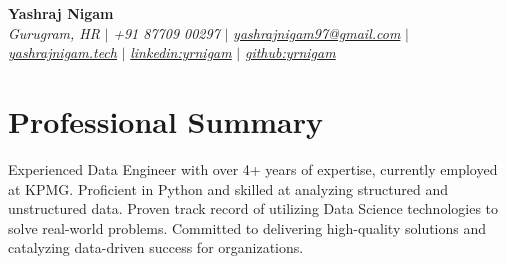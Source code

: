 \documentclass[letterpaper,10pt]{article}
\newcommand{\sectionspace}{
\vspace{-20pt}
}
\begin{document}

\begin{flushleft}
    \textbf{\large Yashraj Nigam} \\    
    \textit{Gurugram, HR} $|$ 
    \textit{+91 87709 00297} $|$  
    \href{mailto:yashrajnigam97@gmail.com}{{\textit{yashrajnigam97@gmail.com}}} $|$
    \href{https://yashrajnigam.tech}{{\textit{yashrajnigam.tech}}} $|$
    \href{https://linkedin.com/in/yrnigam}{{\textit{linkedin:yrnigam}}} $|$
    \href{https://github.com/yrnigam}{{\textit{github:yrnigam}}}
    \vspace{-8pt}
\end{flushleft}
\vspace{-2pt}

\section{Professional Summary}
\vspace{-2pt}
\begin{itemize}[leftmargin=0.15in, label={}]
    {\item{
     {Experienced Data Engineer with over 4+ years of expertise, currently employed at KPMG. Proficient in Python and skilled at analyzing structured and unstructured data. Proven track record of utilizing Data Science technologies to solve real-world problems. Committed to delivering high-quality solutions and catalyzing data-driven success for organizations.} \\      
    }}
 \end{itemize}
 \sectionspace
\vspace{6pt}



\end{document}
